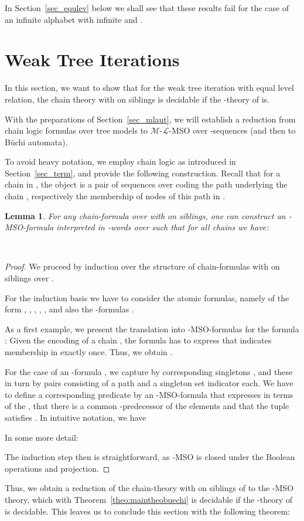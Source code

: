 \documentclass[copyright,creativecommons]{eptcs}
\newtheorem{lemma}[theorem]{Lemma}
\theoremstyle{plain}
\theoremstyle{nonumberplain}
\newtheorem{proof}{Proof}
\newcommand{\eat}[1]{}
\newcommand{\m}{\ensuremath{\mathcal{M}}}
\newcommand{\el}{\ensuremath{\mathcal{L}}}
\newcommand{\ml}{\ensuremath{\m\textrm{-}\el}}
\begin{document}
In Section~\ref{sec_equlev} below we shall see that these results fail for the case of an infinite alphabet  with infinite  and .



\section{Weak Tree Iterations}\label{sec_weaktree}



In this section, we want to show that for the weak tree iteration with 
equal level relation, the chain theory with  on siblings is decidable if the 
-theory of  is. 

With the preparations of Section~\ref{sec_mlaut}, we will establish 
a reduction from chain logic formulas over tree models to \ml-MSO 
over -sequences (and then to B\"uchi automata).

To avoid heavy notation, we employ chain logic as introduced in 
Section~\ref{sec_term}, and provide the following construction. Recall that for 
a chain  in , the object  is a pair of sequences over 
coding the path underlying the chain , respectively the membership 
of nodes of this path in . 
 
\begin{lemma}
For any chain-formula   over  
with  on siblings, one can construct an -MSO-formula  interpreted in -words over  such that for all chains  we have:
\begin{center}
 \\
 
\end{center}
\end{lemma}

\begin{proof}
We proceed by induction over the structure of chain-formulas with  on siblings over .

For the induction basis we have to consider the atomic formulas, namely of the form 
, , , , , and also the -formulas .

As a first example, we present the translation into -MSO-formulas for the formula : Given the encoding  of a chain , the formula  has to express that  indicates membership in  exactly once. Thus, we obtain . 

For the case of an -formula , we capture  by corresponding singletons , and these in turn by pairs  consisting of a path  and a singleton set indicator  each. We have to define a corresponding predicate  by an -MSO-formula\eat{} that expresses in terms of the ,  that there is a common -predecessor  of the elements  and that the tuple  satisfies . In intuitive notation, we have


In some more detail:


The induction step then is straightforward, as -MSO is closed under the Boolean operations and projection. \end{proof}
Thus, we obtain a reduction of the chain-theory  with  on siblings of  to the -MSO theory, which with Theorem~\ref{theo:maintheobuechi} is decidable if the -theory of  is decidable. This leaves us to conclude this section with the following theorem:
\end{document}
